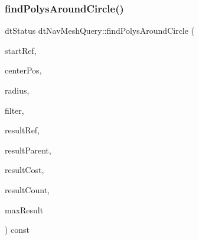 \subsubsection{\texorpdfstring{find\+Polys\+Around\+Circle()}{findPolysAroundCircle()}\hspace{0.1cm}{\footnotesize\ttfamily [2/2]}}
{\footnotesize\ttfamily dt\+Status dt\+Nav\+Mesh\+Query\+::find\+Polys\+Around\+Circle (\begin{DoxyParamCaption}\item[{\hyperlink{group__detour_gab4e0b2257a670c1a800057999612b466}{dt\+Poly\+Ref}}]{start\+Ref,  }\item[{const float $\ast$}]{center\+Pos,  }\item[{const float}]{radius,  }\item[{const \hyperlink{classdtQueryFilter}{dt\+Query\+Filter} $\ast$}]{filter,  }\item[{\hyperlink{group__detour_gab4e0b2257a670c1a800057999612b466}{dt\+Poly\+Ref} $\ast$}]{result\+Ref,  }\item[{\hyperlink{group__detour_gab4e0b2257a670c1a800057999612b466}{dt\+Poly\+Ref} $\ast$}]{result\+Parent,  }\item[{float $\ast$}]{result\+Cost,  }\item[{int $\ast$}]{result\+Count,  }\item[{const int}]{max\+Result }\end{DoxyParamCaption}) const}

